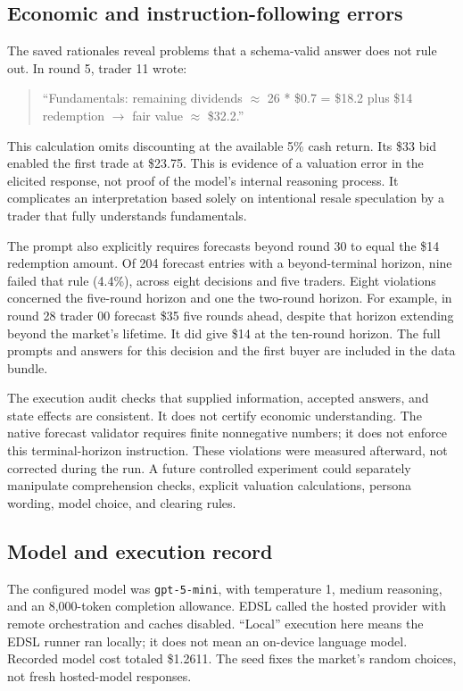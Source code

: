 \documentclass[11pt,letterpaper]{article}
\newcommand{\code}[1]{\texttt{\small #1}}
\begin{document}
\subsection*{Economic and instruction-following errors}
The saved rationales reveal problems that a schema-valid answer does not rule
out. In round 5, trader 11 wrote:
\begin{quote}\small
``Fundamentals: remaining dividends $\approx$ 26 * \$0.7 = \$18.2 plus \$14
redemption $\to$ fair value $\approx$ \$32.2.''
\end{quote}
This calculation omits discounting at the available 5\% cash return. Its
\$33 bid enabled the first trade at \$23.75. This is evidence of a valuation
error in the elicited response, not proof of the model's internal reasoning
process. It complicates an interpretation based solely on intentional
resale speculation by a trader that fully understands fundamentals.

The prompt also explicitly requires forecasts beyond round 30 to equal the
\$14 redemption amount. Of 204 forecast entries with a beyond-terminal
horizon, nine failed that rule (4.4\%), across eight decisions and five traders.
Eight violations concerned the five-round horizon and one the two-round
horizon. For example, in round 28 trader 00 forecast \$35 five rounds ahead,
despite that horizon extending beyond the market's lifetime. It did give
\$14 at the ten-round horizon. The full prompts and answers for this decision
and the first buyer are included in the data bundle.

The execution audit checks that supplied information, accepted answers, and
state effects are consistent. It does not certify economic understanding.
The native forecast validator requires finite nonnegative numbers; it does
not enforce this terminal-horizon instruction. These violations were measured
afterward, not corrected during the run. A future controlled experiment could
separately manipulate comprehension checks, explicit valuation calculations,
persona wording, model choice, and clearing rules.

\subsection*{Model and execution record}
The configured model was \code{gpt-5-mini}, with temperature 1, medium reasoning,
and an 8,000-token completion allowance. EDSL called the hosted provider with
remote orchestration and caches disabled. ``Local'' execution here means the
EDSL runner ran locally; it does not mean an on-device language model. Recorded
model cost totaled \$1.2611. The seed fixes the market's random choices, not
fresh hosted-model responses.
\end{document}
